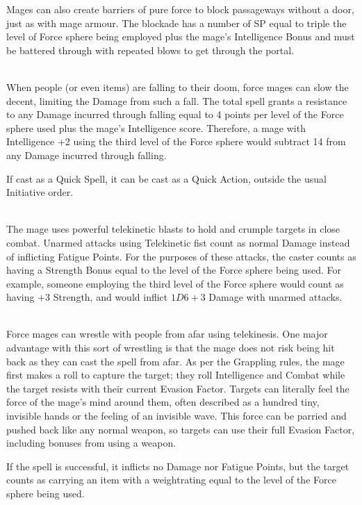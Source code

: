 \begin{multicols}{2}
Mages can also create barriers of pure force to block passageways without a door, just as with mage armour.
The blockade has a number of \gls{SP} equal to triple the level of Force sphere being employed plus the mage's Intelligence Bonus and must be battered through with repeated blows to get through the portal.

\\
When people (or even items) are falling to their doom, force mages can slow the decent, limiting the Damage from such a fall.
The total spell grants a resistance to any Damage incurred through falling equal to 4 points per level of the Force sphere used plus the mage's Intelligence score.
Therefore, a mage with Intelligence +2 using the third level of the Force sphere would subtract 14 from any Damage incurred through falling.

If cast as a Quick Spell, it can be cast as a Quick Action, outside the usual Initiative order.

\\
The mage uses powerful telekinetic blasts to hold and crumple targets in close combat.
Unarmed attacks using Telekinetic fist count as normal Damage instead of inflicting Fatigue Points.
For the purposes of these attacks, the caster counts as having a Strength Bonus equal to the level of the Force sphere being used.
For example, someone employing the third level of the Force sphere would count as having +3 Strength, and would inflict $1D6+3$ Damage with unarmed attacks.

\\
Force mages can wrestle with people from afar using telekinesis. One major advantage with this sort of wrestling is that the mage does not risk being hit back as they can cast the spell from afar. As per the Grappling rules, the mage first makes a roll to capture the target; they roll Intelligence and Combat while the target resists with their current Evasion Factor. Targets can literally feel the force of the mage's mind around them, often described as a hundred tiny, invisible hands or the feeling of an invisible wave. This force can be parried and pushed back like any normal weapon, so targets can use their full Evasion Factor, including bonuses from using a weapon.

If the spell is successful, it inflicts no Damage nor Fatigue Points, but the target counts as carrying an item with a \gls{weightrating} equal to the level of the Force sphere being used.


\end{multicols}
